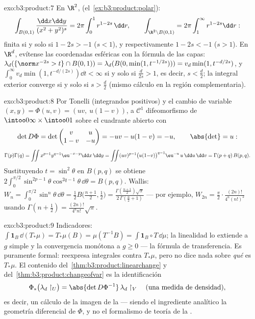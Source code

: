 \begin{solution}{exo:b3:product:7}
En $\R^2$, 
(el~\cref{ex:b3:product:polar}):
\[
\int_{B(0,1)}\frac{\dd x\dd y}{(x^2+y^2)^s}
= 2\pi\int_0^1 r^{1 - 2s}\,\dd r,
\qquad
\int_{\R^2\setminus B(0,1)} = 2\pi\int_1^\infty r^{1-2s}\dd r:
\]
finita si y solo si $1 - 2s > -1$ ($s < 1$), y respectivamente
$1 - 2s < -1$ ($s >
1$). En $\R^d$, evítense las coordenadas esféricas con la fórmula de las
capas: $\lambda_d(\{\norm x^{-2s} > t\}\cap B(0,1)) =
\lambda_d(B(0, \min(1, t^{-1/2s}))) = v_d\min(1, t^{-d/2s})$, y
$\int_0^\infty v_d\min(1, t^{-d/(2s)})\dd t < \infty$ si y solo si
$\frac d{2s} > 1$, es decir, $s < \frac d2$; la integral exterior
converge si y solo si $s > \frac d2$ (mismo cálculo en la región
complementaria).
\end{solution}

\begin{solution}{exo:b3:product:8}
Por Tonelli (integrandos positivos) y el cambio de variable
$(x, y) = \Phi(u, v) = (uv,\ u(1-v))$, a $\mathcal C^1$
difeomorfismo de $\intoo0\infty\times\intoo01$ sobre el cuadrante
abierto con
\[
\det D\Phi = \det\begin{pmatrix} v & u\\ 1 - v & -u
\end{pmatrix} = -uv - u(1 - v) = -u,
\qquad \abs{\det} = u :
\]
\[
\Gamma(p)\Gamma(q) =
\iint x^{p-1}y^{q-1}\eu^{-x-y}\dd x\,\dd y
= \iint (uv)^{p-1}\bigl(u(1{-}v)\bigr)^{q-1}\eu^{-u}\,u\,
\dd u\,\dd v
= \Gamma(p + q)\,B(p, q).
\]
Sustituyendo $t = \sin^2\theta$ en $B(p,q)$ se obtiene
$2\int_0^{\pi/2}\sin^{2p-1}\theta\cos^{2q-1}\theta\,\dd\theta =
B(p, q)$. Wallis: $W_n =
\int_0^{\pi/2}\sin^n\theta\,\dd\theta = \frac12B\bigl(\frac{n +
1}2, \frac12\bigr) = \frac{\Gamma(\frac{n+1}2)\sqrt\pi}
{2\,\Gamma(\frac n2 + 1)}$ --- por ejemplo, $W_{2n} =
\frac\pi2\cdot\frac{(2n)!}{4^n(n!)^2}$ usando
$\Gamma(n + \frac12) = \frac{(2n)!}{4^nn!}\sqrt\pi$.
\end{solution}

\begin{solution}{exo:b3:product:9}
Indicadores: $\int\mathbf 1_B\,\dd(T_*\mu) = T_*\mu(B) =
\mu(T^{-1}B) = \int\mathbf 1_B\circ T\,\dd\mu$; la linealidad lo
extiende a $g$ simple y la convergencia monótona a $g \geq 0$ --- la
fórmula de transferencia. Es puramente formal: reexpresa integrales
contra $T_*\mu$, pero no dice nada sobre \emph{qué} es $T_*\mu$. El
contenido del~\cref{thm:b3:product:linearchange} y
del~\cref{thm:b3:product:changeofvar} es la identificación
\[
\Phi_*\bigl(\lambda_d\restriction_U\bigr) =
\abs{\det D\Phi^{-1}}\,\lambda_d\restriction_V
\quad\text{(una medida de densidad)},
\]
es decir, un cálculo de la  imagen de la
 --- siendo el
ingrediente analítico la geometría diferencial de $\Phi$, y no el
formalismo de teoría de la .
\end{solution}

